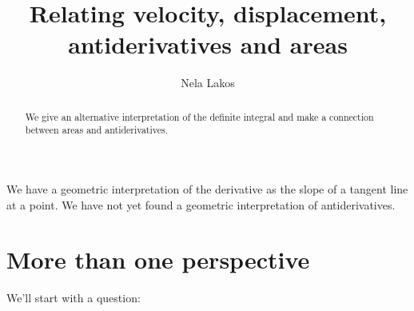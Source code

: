 \documentclass{ximera}
\author{Nela Lakos}
\title[Dig-In:]{Relating velocity, displacement, antiderivatives and areas}
\begin{document}
\begin{abstract}
We give an alternative interpretation of the definite integral and make a connection between  areas and antiderivatives.
\end{abstract}
\maketitle

 We have a
geometric interpretation of the derivative as the slope of a tangent
line at a point.  We have not yet found a geometric interpretation of
antiderivatives.


\section{More than one perspective}

We'll start with a question:
\end{document}
